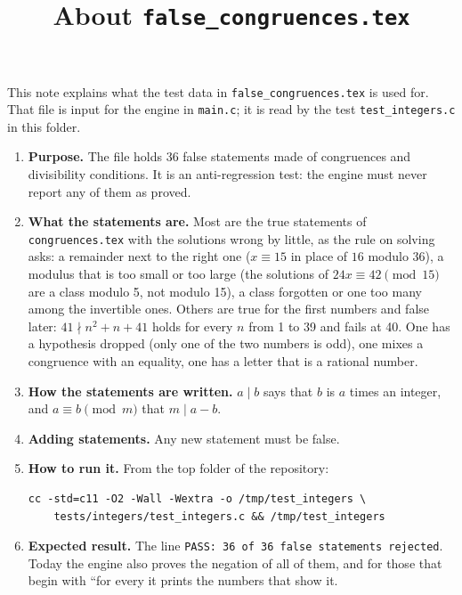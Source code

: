 \documentclass[11pt,a4paper]{article}
\title{About \texttt{false\_congruences.tex}}
\author{}
\date{}
\begin{document}
\maketitle
This note explains what the test data in \texttt{false\_congruences.tex} is used for. That file is input for the engine in \texttt{main.c}; it is read by the test \texttt{test\_integers.c} in this folder.

\begin{enumerate}
\item \textbf{Purpose.} The file holds 36 false statements made of congruences and divisibility conditions. It is an anti-regression test: the engine must never report any of them as proved.

\item \textbf{What the statements are.} Most are the true statements of \texttt{congruences.tex} with the solutions wrong by little, as the rule on solving asks: a remainder next to the right one ($x \equiv 15$ in place of $16$ modulo 36), a modulus that is too small or too large (the solutions of $24x \equiv 42 \pmod{15}$ are a class modulo 5, not modulo 15), a class forgotten or one too many among the invertible ones. Others are true for the first numbers and false later: $41 \nmid n^{2} + n + 41$ holds for every $n$ from 1 to 39 and fails at 40. One has a hypothesis dropped (only one of the two numbers is odd), one mixes a congruence with an equality, one has a letter that is a rational number.

\item \textbf{How the statements are written.} $a \mid b$ says that $b$ is $a$ times an integer, and $a \equiv b \pmod{m}$ that $m \mid a - b$.

\item \textbf{Adding statements.} Any new statement must be false.

\item \textbf{How to run it.} From the top folder of the repository:
\begin{verbatim}
cc -std=c11 -O2 -Wall -Wextra -o /tmp/test_integers \
    tests/integers/test_integers.c && /tmp/test_integers
\end{verbatim}

\item \textbf{Expected result.} The line \texttt{PASS: 36 of 36 false statements rejected}. Today the engine also proves the negation of all of them, and for those that begin with ``for every it prints the numbers that show it.
\end{enumerate}
\end{document}
